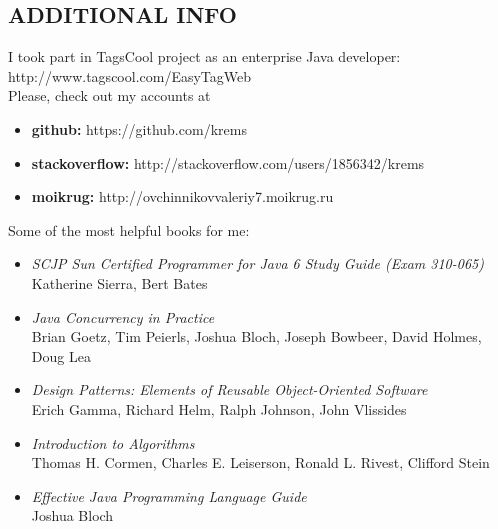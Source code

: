 \documentclass[margin,12pt]{res}
\begin{document}
\begin{resume}
\section{ADDITIONAL INFO}
I took part in TagsCool project as an enterprise Java developer:\\
http://www.tagscool.com/EasyTagWeb\\
Please, check out my accounts at\\
\begin{itemize} \itemsep -10pt
  \item \textbf{github:} https://github.com/krems\\
  \item \textbf{stackoverflow:} http://stackoverflow.com/users/1856342/krems\\
  \item \textbf{moikrug:} http://ovchinnikovvaleriy7.moikrug.ru
\end{itemize}
Some of the most helpful books for me:\\
\begin{itemize} \itemsep -5pt
\item \textit{SCJP Sun Certified Programmer for Java 6 Study Guide
  (Exam 310-065)}\\ Katherine Sierra, Bert Bates\\
\item \textit{Java Concurrency in Practice}\\ Brian Goetz, Tim Peierls,
  Joshua Bloch, Joseph Bowbeer, David Holmes, Doug Lea\\
\item \textit{Design Patterns: Elements of Reusable Object-Oriented
  Software}\\ Erich Gamma, Richard Helm, Ralph Johnson, John Vlissides\\
\item \textit{Introduction to Algorithms}\\ Thomas H. Cormen, Charles
  E. Leiserson, Ronald L. Rivest, Clifford Stein\\
\item \textit{Effective Java Programming Language Guide}\\ Joshua Bloch\\
\end{itemize}
\end{resume}
\end{document}

